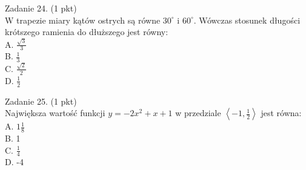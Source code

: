 \documentclass[10pt]{article}
\begin{document}
Zadanie 24. (1 pkt)\\
W trapezie miary kątów ostrych są równe \(30^{\circ}\) i \(60^{\circ}\). Wówczas stosunek długości krótszego ramienia do dłuższego jest równy:\\
A. \(\frac{\sqrt{3}}{3}\)\\
B. \(\frac{1}{3}\)\\
C. \(\frac{\sqrt{2}}{2}\)\\
D. \(\frac{1}{2}\)

Zadanie 25. (1 pkt)\\
Największa wartość funkcji \(y=-2 x^{2}+x+1\) w przedziale \(\left\langle-1, \frac{1}{2}\right\rangle\) jest równa:\\
A. \(1 \frac{1}{8}\)\\
B. 1\\
C. \(\frac{1}{4}\)\\
D. -4
\end{document}
